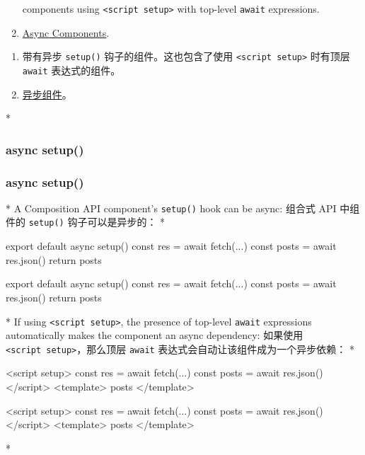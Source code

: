 \begin{paracol}{2}
\begin{enumerate}
  components using \texttt{\textless{}script\ setup\textgreater{}} with
  top-level \texttt{await} expressions.
\item
  \href{https://vuejs.org/guide/components/async.html}{Async
  Components}.
\end{enumerate}
\switchcolumn
\begin{enumerate}
\item
  带有异步 \texttt{setup()} 钩子的组件。这也包含了使用
  \texttt{\textless{}script\ setup\textgreater{}} 时有顶层
  \texttt{await} 表达式的组件。
\item
  \href{https://cn.vuejs.org/guide/components/async.html}{异步组件}。
\end{enumerate}
\end{paracol}

\begin{paracol}{2}
 
\switchcolumn[0]*%
\subsubsection{async setup()}
\switchcolumn
\subsubsection{async setup()}
\switchcolumn[0]*%
A Composition API component's \texttt{setup()} hook can be async:
\switchcolumn
组合式 API 中组件的 \texttt{setup()} 钩子可以是异步的：
\switchcolumn[0]*%
\begin{codeJs}
export default {
  async setup() {
    const res = await fetch(...)
    const posts = await res.json()
    return {
      posts
    }
  }
}
\end{codeJs}
\switchcolumn
\begin{codeJs}
export default {
  async setup() {
    const res = await fetch(...)
    const posts = await res.json()
    return {
      posts
    }
  }
}
\end{codeJs}
\switchcolumn[0]*%
If using \texttt{\textless{}script\ setup\textgreater{}}, the presence
of top-level \texttt{await} expressions automatically makes the
component an async dependency:
\switchcolumn
如果使用 \texttt{\textless{}script\ setup\textgreater{}}，那么顶层
\texttt{await} 表达式会自动让该组件成为一个异步依赖：
\switchcolumn[0]*%
\begin{codeHtml}
<script setup>
const res = await fetch(...)
const posts = await res.json()
</script>
<template>
  {{ posts }}
</template>
\end{codeHtml}
\switchcolumn
\begin{codeHtml}
<script setup>
const res = await fetch(...)
const posts = await res.json()
</script>
<template>
  {{ posts }}
</template>
\end{codeHtml}
\switchcolumn[0]*%

\end{paracol}
